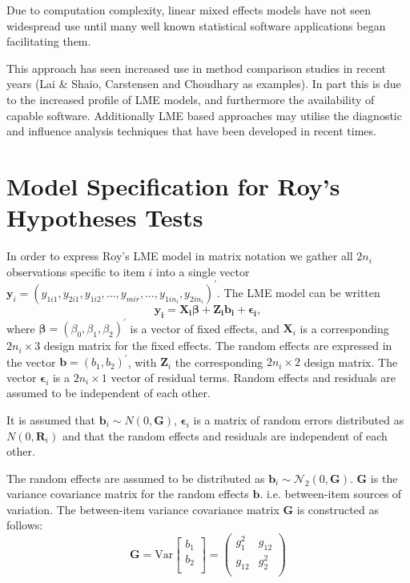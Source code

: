 \documentclass[12pt, a4paper]{report}
\theoremstyle{plain}
\theoremstyle{definition}
\theoremstyle{remark}
\begin{document}
Due to computation complexity, linear mixed effects models have not seen widespread use until many well known statistical software applications began facilitating them. 

This approach has seen increased use in method comparison studies in recent years (Lai \& Shaio, Carstensen and Choudhary as examples). In part this is due to the increased profile of LME models, and furthermore the availability of capable software. Additionally LME based approaches may utilise the diagnostic and influence analysis techniques that have been developed in recent times.




\section{Model Specification for Roy's Hypotheses Tests}

In order to express Roy's LME model in matrix notation we gather all $2n_i$ observations specific to item $i$ into a single vector  $\boldsymbol{y}_{i} = (y_{1i1},y_{2i1},y_{1i2},\ldots,y_{mir},\ldots,y_{1in_{i}},y_{2in_{i}})^\prime.$ The LME model can be written
\[
\boldsymbol{y_{i}} = \boldsymbol{X_{i}\beta} + \boldsymbol{Z_{i}b_{i}} + \boldsymbol{\epsilon_{i}},
\]
where $\boldsymbol{\beta}=(\beta_0,\beta_1,\beta_2)^\prime$ is a vector of fixed effects, and $\boldsymbol{X}_i$ is a corresponding $2n_i\times 3$ design matrix for the fixed effects. The random effects are expressed in the vector $\boldsymbol{b}=(b_1,b_2)^\prime$, with $\boldsymbol{Z}_i$ the corresponding $2n_i\times 2$ design matrix. The vector $\boldsymbol{\epsilon}_i$ is a $2n_i\times 1$ vector of residual terms. Random effects and residuals are assumed to be independent of each other.

It is assumed that $\boldsymbol{b}_i \sim N(0,\boldsymbol{G})$, $\boldsymbol{\epsilon}_i$ is a matrix of random errors distributed as $N(0,\boldsymbol{R}_i)$ and that the random effects and residuals are 
independent of each other.

The random effects are assumed to be distributed as $\boldsymbol{b}_i \sim \mathcal{N}_2(0,\boldsymbol{G})$. 	$\boldsymbol{G}$ is the variance covariance matrix for the random effects $\boldsymbol{b}$.
i.e. between-item sources of variation. The between-item variance covariance matrix $\boldsymbol{G}$ is constructed as follows:
\[ \boldsymbol{G} = \mbox{Var}  \left[
\begin{array}{c}
b_1   \\
b_2  \\
\end{array}
\right] =  \left(
\begin{array}{cc}
g^2_1  & g_{12} \\
g_{12} & g^2_2 \\
\end{array}
\right) \]
\end{document}
